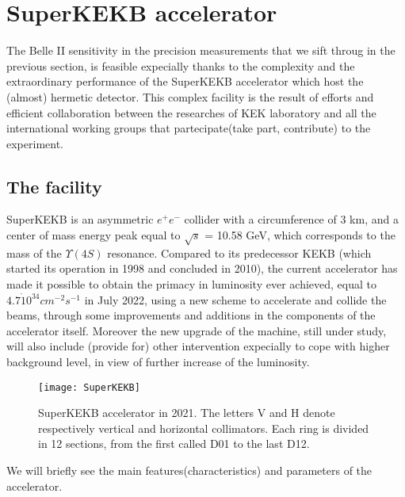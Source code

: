 \section{SuperKEKB accelerator}

The Belle II sensitivity in the precision measurements that we sift throug in the previous section, is feasible expecially thanks to the complexity and the extraordinary performance of the SuperKEKB accelerator which host the (almost) hermetic detector. This complex facility is the result of efforts and efficient collaboration between the researches of KEK laboratory and all the international working groups that partecipate(take part, contribute) to the experiment.

\subsection{The facility}

SuperKEKB is an asymmetric $e^{+}e^{-}$ collider with a circumference of 3 km, and a center of mass energy peak equal to  $\sqrt{s}$ = 10.58 GeV, which corresponds to the mass of the $\Upsilon(4S)$ resonance.
Compared to its predecessor KEKB (which started its operation in 1998 and concluded in 2010), the current accelerator has made it possible to obtain the primacy in luminosity ever achieved, equal to $4.7\dot10^{34} cm^{-2}s^{-1}$ in July 2022, using a new scheme to accelerate and collide the beams, through some improvements and additions in the components of the accelerator itself. Moreover the new upgrade of the machine, still under study, will also include (provide for) other intervention expecially to cope with higher background level, in view of further increase of the luminosity.

\begin{figure}[h!]
\centering
\texttt{[image: SuperKEKB]}
\caption{SuperKEKB accelerator in 2021. The letters V and H denote respectively vertical and horizontal collimators. Each ring is divided in 12 sections, from the first called D01 to the last D12.}
\label{fig:superkekb}
\end{figure}


We will briefly see the main features(characteristics) and parameters of the accelerator.\\

